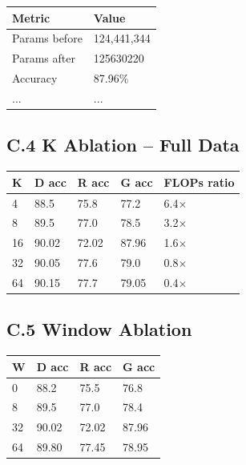 \begin{table}[H]
\centering
\small
\begin{tabular}{ll}
\toprule
\textbf{Metric} & \textbf{Value} \\
\midrule
Params before & 124,441,344 \\
Params after & 125630220 \\
Accuracy & 87.96\% \\
... & ... \\
\bottomrule
\end{tabular}
\end{table}

\subsection{C.4 K Ablation -- Full Data}

\begin{table}[H]
\centering
\small
\begin{tabular}{lllll}
\toprule
\textbf{K} & \textbf{D acc} & \textbf{R acc} & \textbf{G acc} & \textbf{FLOPs ratio} \\
\midrule
4 & 88.5 & 75.8 & 77.2 & 6.4$\times$ \\
8 & 89.5 & 77.0 & 78.5 & 3.2$\times$ \\
16 & 90.02 & 72.02 & 87.96 & 1.6$\times$ \\
32 & 90.05 & 77.6 & 79.0 & 0.8$\times$ \\
64 & 90.15 & 77.7 & 79.05 & 0.4$\times$ \\
\bottomrule
\end{tabular}
\end{table}

\subsection{C.5 Window Ablation}

\begin{table}[H]
\centering
\small
\begin{tabular}{llll}
\toprule
\textbf{W} & \textbf{D acc} & \textbf{R acc} & \textbf{G acc} \\
\midrule
0 & 88.2 & 75.5 & 76.8 \\
8 & 89.5 & 77.0 & 78.4 \\
32 & 90.02 & 72.02 & 87.96 \\
64 & 89.80 & 77.45 & 78.95 \\
\bottomrule
\end{tabular}
\end{table}

